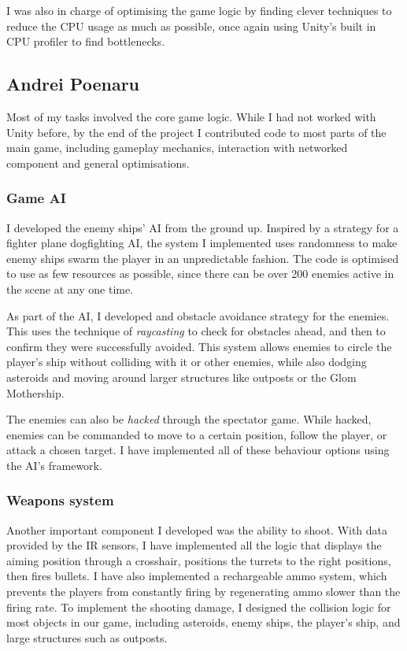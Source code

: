 \documentclass[a4paper,11pt]{article}
\begin{document}
I was also in charge of optimising the game logic by finding clever techniques to reduce the CPU usage as much as possible, once again using Unity’s built in CPU profiler to find bottlenecks.

\clearpage

\subsection{Andrei Poenaru}

Most of my tasks involved the core game logic. While I had not worked with Unity before, by the end of the project I contributed code to most parts of the main game, including gameplay mechanics, interaction with networked component and general optimisations.

\subsubsection{Game AI}

I developed the enemy ships’ AI from the ground up. Inspired by a strategy for a fighter plane dogfighting AI, the system I implemented uses randomness to make enemy ships swarm the player in an unpredictable fashion. The code is optimised to use as few resources as possible, since there can be over 200 enemies active in the scene at any one time.

As part of the AI, I developed and obstacle avoidance strategy for the enemies. This uses the technique of \emph{raycasting} to check for obstacles ahead, and then to confirm they were successfully avoided. This system allows enemies to circle the player’s ship without colliding with it or other enemies, while also dodging asteroids and moving around larger structures like outposts or the Glom Mothership.

The enemies can also be \emph{hacked} through the spectator game. While hacked, enemies can be commanded to move to a certain position, follow the player, or attack a chosen target. I have implemented all of these behaviour options using the AI’s framework.

\subsubsection{Weapons system}

Another important component I developed was the ability to shoot. With data provided by the IR sensors, I have implemented all the logic that displays the aiming position through a crosshair, positions the turrets to the right positions, then fires bullets. I have also implemented a rechargeable ammo system, which prevents the players from constantly firing by regenerating ammo slower than the firing rate. To implement the shooting damage, I designed the collision logic for most objects in our game, including asteroids, enemy ships, the player’s ship, and large structures such as outposts.
\end{document}

